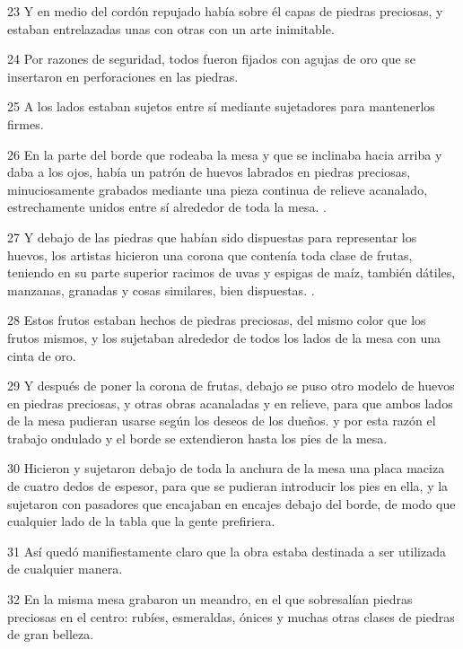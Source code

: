 \par 23 Y en medio del cordón repujado había sobre él capas de piedras preciosas, y estaban entrelazadas unas con otras con un arte inimitable.

\par 24 Por razones de seguridad, todos fueron fijados con agujas de oro que se insertaron en perforaciones en las piedras.

\par 25 A los lados estaban sujetos entre sí mediante sujetadores para mantenerlos firmes.

\par 26 En la parte del borde que rodeaba la mesa y que se inclinaba hacia arriba y daba a los ojos, había un patrón de huevos labrados en piedras preciosas, minuciosamente grabados mediante una pieza continua de relieve acanalado, estrechamente unidos entre sí alrededor de toda la mesa. .

\par 27 Y debajo de las piedras que habían sido dispuestas para representar los huevos, los artistas hicieron una corona que contenía toda clase de frutas, teniendo en su parte superior racimos de uvas y espigas de maíz, también dátiles, manzanas, granadas y cosas similares, bien dispuestas. .

\par 28 Estos frutos estaban hechos de piedras preciosas, del mismo color que los frutos mismos, y los sujetaban alrededor de todos los lados de la mesa con una cinta de oro.

\par 29 Y después de poner la corona de frutas, debajo se puso otro modelo de huevos en piedras preciosas, y otras obras acanaladas y en relieve, para que ambos lados de la mesa pudieran usarse según los deseos de los dueños. y por esta razón el trabajo ondulado y el borde se extendieron hasta los pies de la mesa.

\par 30 Hicieron y sujetaron debajo de toda la anchura de la mesa una placa maciza de cuatro dedos de espesor, para que se pudieran introducir los pies en ella, y la sujetaron con pasadores que encajaban en encajes debajo del borde, de modo que cualquier lado de la tabla que la gente prefiriera.

\par 31 Así quedó manifiestamente claro que la obra estaba destinada a ser utilizada de cualquier manera.

\par 32 En la misma mesa grabaron un meandro, en el que sobresalían piedras preciosas en el centro: rubíes, esmeraldas, ónices y muchas otras clases de piedras de gran belleza.

